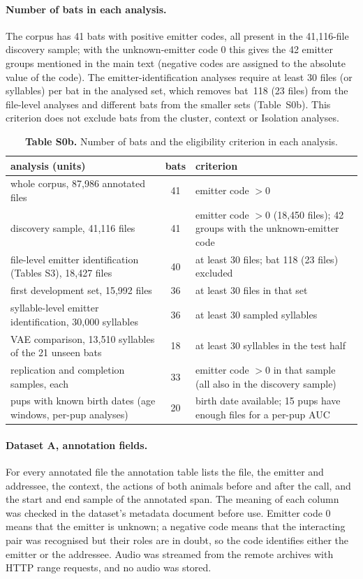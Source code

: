 \documentclass[11pt]{article}
\begin{document}
\paragraph{Number of bats in each analysis.} The corpus has 41 bats with positive emitter codes, all present in the 41,116-file discovery sample; with the unknown-emitter code 0 this gives the 42 emitter groups mentioned in the main text (negative codes are assigned to the absolute value of the code). The emitter-identification analyses require at least 30 files (or syllables) per bat in the analysed set, which removes bat~118 (23 files) from the file-level analyses and different bats from the smaller sets (Table~S0b). This criterion does not exclude bats from the cluster, context or Isolation analyses.

\begin{table}[htbp]\centering\scriptsize
\caption{\textbf{Table S0b.} Number of bats and the eligibility criterion in each analysis.}
\begin{tabular}{p{6.6cm}cp{6.4cm}}
\toprule
analysis (units) & bats & criterion \\
\midrule
whole corpus, 87,986 annotated files & 41 & emitter code $>0$ \\
discovery sample, 41,116 files & 41 & emitter code $>0$ (18,450 files); 42 groups with the unknown-emitter code \\
file-level emitter identification (Tables S3), 18,427 files & 40 & at least 30 files; bat 118 (23 files) excluded \\
first development set, 15,992 files & 36 & at least 30 files in that set \\
syllable-level emitter identification, 30,000 syllables & 36 & at least 30 sampled syllables \\
VAE comparison, 13,510 syllables of the 21 unseen bats & 18 & at least 30 syllables in the test half \\
replication and completion samples, each & 33 & emitter code $>0$ in that sample (all also in the discovery sample) \\
pups with known birth dates (age windows, per-pup analyses) & 20 & birth date available; 15 pups have enough files for a per-pup AUC \\
\bottomrule
\end{tabular}
\end{table}

\paragraph{Dataset A, annotation fields.} For every annotated file the annotation table lists the file, the emitter and addressee, the context, the actions of both animals before and after the call, and the start and end sample of the annotated span. The meaning of each column was checked in the dataset's metadata document before use. Emitter code 0 means that the emitter is unknown; a negative code means that the interacting pair was recognised but their roles are in doubt, so the code identifies either the emitter or the addressee. Audio was streamed from the remote archives with HTTP range requests, and no audio was stored.
\end{document}
